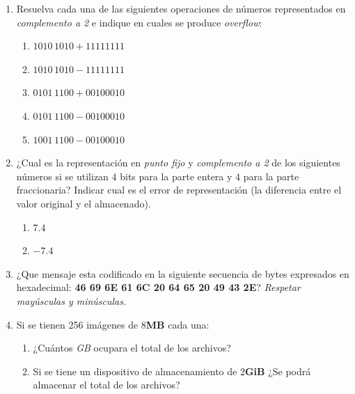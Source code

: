 \documentclass[12pt]{article}
\begin{document}
\begin{enumerate}
\begin{enumerate}
        \end{enumerate}

    \item Resuelva cada una de las siguientes operaciones de números
    representados en \emph{complemento a 2} e indique en cuales se produce
    \emph{overflow}:

        \begin{enumerate}

            \item $1010\,1010 + 1111 1111$
            \item $1010\,1010 - 1111 1111$
            \item $0101\,1100 + 0010 0010$
            \item $0101\,1100 - 0010 0010$
            \item $1001\,1100 - 0010 0010$

        \end{enumerate}

    \item ¿Cual es la representación en \emph{punto fijo} y \emph{complemento
        a 2} de los siguientes números si se utilizan 4 bits para la parte
        entera y 4 para la parte fraccionaria? Indicar cual es el error de
        representación (la diferencia entre el valor original y el
        almacenado).

        \begin{enumerate}

            \item $7.4$

            \item $-7.4$

        \end{enumerate}

    \item ¿Que mensaje esta codificado en la siguiente secuencia de bytes
        expresados en hexadecimal: \textbf{46 69 6E 61 6C 20 64 65  20 49 43 2E}?
        \emph{Respetar mayúsculas y minúsculas.}

    \item Si se tienen 256 imágenes de 8\textbf{MB} cada una:

        \begin{enumerate}

            \item ¿Cuántos \emph{GB} ocupara el total de los archivos?

            \item Si se tiene un dispositivo de almacenamiento de
            2\textbf{GiB} ¿Se podrá almacenar el total de los archivos?

        \end{enumerate}

\end{enumerate}
\end{document}
